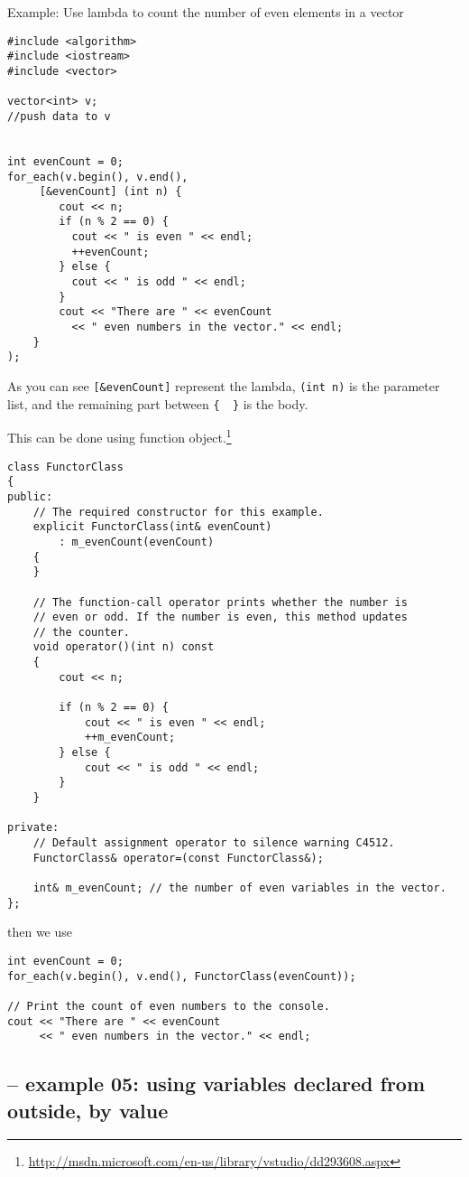 Example: Use lambda to count the number of even elements in a vector
\begin{verbatim}
#include <algorithm>
#include <iostream>
#include <vector>

vector<int> v;
//push data to v


int evenCount = 0;
for_each(v.begin(), v.end(), 
     [&evenCount] (int n) {
   		cout << n;
        if (n % 2 == 0) {
          cout << " is even " << endl;
          ++evenCount;
   	    } else {
          cout << " is odd " << endl;
        }
        cout << "There are " << evenCount 
          << " even numbers in the vector." << endl;
    }      
);
\end{verbatim}
As you can see \verb![&evenCount]! represent the lambda, \verb!(int n)! is the
parameter list, and the remaining part between \verb!{  }! is the body.

This can be done using function
object.\footnote{\url{http://msdn.microsoft.com/en-us/library/vstudio/dd293608.aspx}}
\begin{lstlisting}
class FunctorClass
{
public:
    // The required constructor for this example.
    explicit FunctorClass(int& evenCount) 
        : m_evenCount(evenCount)
    {
    }

    // The function-call operator prints whether the number is
    // even or odd. If the number is even, this method updates
    // the counter.
    void operator()(int n) const
    {
        cout << n;

        if (n % 2 == 0) {
            cout << " is even " << endl;
            ++m_evenCount;
        } else {
            cout << " is odd " << endl;
        }
    }

private:
    // Default assignment operator to silence warning C4512.
    FunctorClass& operator=(const FunctorClass&);

    int& m_evenCount; // the number of even variables in the vector.
};
\end{lstlisting}
then we use
\begin{verbatim}
int evenCount = 0;
for_each(v.begin(), v.end(), FunctorClass(evenCount));

// Print the count of even numbers to the console.
cout << "There are " << evenCount 
     << " even numbers in the vector." << endl;
\end{verbatim}

\subsection{-- example 05: using variables declared from outside, by value}



